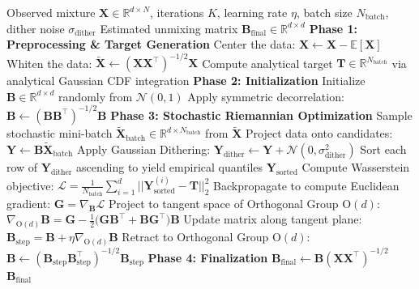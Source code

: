 \documentclass[accepted]{tpm2026} %
\begin{document}
\begin{algorithm}[htbp]
\caption{The Optimal Transport ICA (OT-ICA) Algorithm}
\label{alg:ot_ica}
\begin{algorithmic}[1]\label{algo:1}
\Require Observed mixture $\mathbf{X} \in \mathbb{R}^{d \times N}$, iterations $K$, learning rate $\eta$, batch size $N_{\text{batch}}$, dither noise $\sigma_{\text{dither}}$
\Ensure Estimated unmixing matrix $\mathbf{B}_{\text{final}} \in \mathbb{R}^{d \times d}$
\State \textbf{Phase 1: Preprocessing \& Target Generation}
\State Center the data: $\mathbf{X} \gets \mathbf{X} - \mathbb{E}[\mathbf{X}]$
\State Whiten the data: $\widetilde{\mathbf{X}} \gets (\mathbf{X}\mathbf{X}^\top)^{-1/2} \mathbf{X}$
\State Compute analytical target $\mathbf{T} \in \mathbb{R}^{N_{\text{batch}}}$ via analytical Gaussian CDF integration
\State \textbf{Phase 2: Initialization}
\State Initialize $\mathbf{B} \in \mathbb{R}^{d \times d}$ randomly from $\mathcal{N}(0,1)$
\State Apply symmetric decorrelation: $\mathbf{B} \gets (\mathbf{B}\mathbf{B}^\top)^{-1/2} \mathbf{B}$
\State \textbf{Phase 3: Stochastic Riemannian Optimization}
    \State Sample stochastic mini-batch $\widetilde{\mathbf{X}}_{\text{batch}} \in \mathbb{R}^{d \times N_{\text{batch}}}$ from $\widetilde{\mathbf{X}}$
    \State Project data onto candidates: $\mathbf{Y} \gets \mathbf{B} \widetilde{\mathbf{X}}_{\text{batch}}$
    \State Apply Gaussian Dithering: $\mathbf{Y}_{\text{dither}} \gets \mathbf{Y} + \mathcal{N}(0, \sigma_{\text{dither}}^2)$
    \State Sort each row of $\mathbf{Y}_{\text{dither}}$ ascending to yield empirical quantiles $\mathbf{Y}_{\text{sorted}}$
    \State Compute Wasserstein objective: $\mathcal{L} = \frac{1}{N_{\text{batch}}} \sum_{i=1}^{d} ||\mathbf{Y}_{\text{sorted}}^{(i)} - \mathbf{T}||_2^2$
    \State Backpropagate to compute Euclidean gradient: $\mathbf{G} = \nabla_{\mathbf{B}} \mathcal{L}$
    \State Project to tangent space of Orthogonal Group $\mathrm{O}(d)$: $\nabla_{\mathrm{O}(d)} \mathbf{B} = \mathbf{G} - \frac{1}{2}\big(\mathbf{G}\mathbf{B}^\top + \mathbf{B}\mathbf{G}^\top \big)\mathbf{B}$
    \State Update matrix along tangent plane: $\mathbf{B}_{\text{step}} = \mathbf{B} + \eta \nabla_{\mathrm{O}(d)} \mathbf{B}$
    \State Retract to Orthogonal Group $\mathrm{O}(d)$: $\mathbf{B} \gets (\mathbf{B}_{\text{step}}\mathbf{B}_{\text{step}}^\top)^{-1/2} \mathbf{B}_{\text{step}}$
\EndFor
\State \textbf{Phase 4: Finalization}
\State $\mathbf{B}_{\text{final}} \gets \mathbf{B} (\mathbf{X}\mathbf{X}^\top)^{-1/2}$ 
\State \Return $\mathbf{B}_{\text{final}}$
\end{algorithmic}
\end{algorithm}
\end{document}
